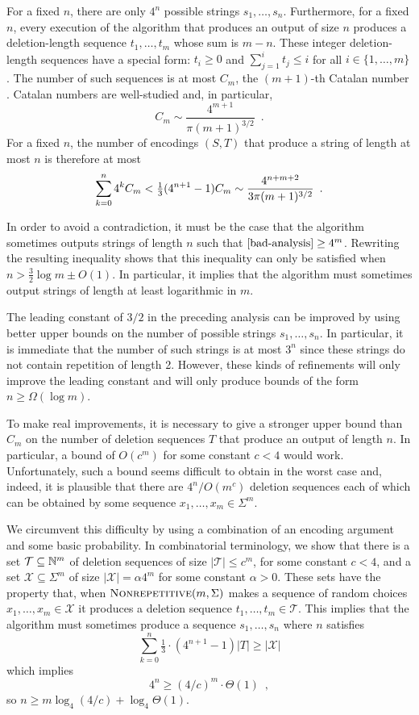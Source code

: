 \documentclass{patmorin}
\begin{document}
For a fixed $n$, there are only $4^n$ possible strings $s_1,\ldots,s_n$.  Furthermore, for a fixed $n$, every execution of the algorithm that produces an output of size $n$ produces a deletion-length sequence $t_1,\ldots,t_m$ whose sum is $m-n$.  These integer deletion-length sequences have a special form: $t_i\ge 0$ and $\sum_{j=1}^i t_j\le i$ for all $i\in\{1,\ldots,m\}$. The number of such sequences is at most $C_{m}$, the $(m+1)$-th Catalan number \cite{X}.  Catalan numbers are well-studied and, in particular,
\[
     C_m \sim \frac{4^{m+1}}{\pi(m+1)^{3/2}} \enspace .
\]
For a fixed $n$, the number of encodings $(S,T)$ that produce a string of length at most $n$ is therefore at most
\begin{equation}
     \sum_{k=0}^n 4^{k} C_m < \tfrac{1}{3}(4^{n+1}-1) C_m \sim \frac{4^{n+m+2}}{3\pi(m+1)^{3/2}} \enspace . \eqlabel{bad-analysis}
\end{equation}

In order to avoid a contradiction, it must be the case that the algorithm sometimes outputs strings of length $n$ such that $\eqref{bad-analysis} \ge 4^m$.  Rewriting the resulting inequality shows that this inequality can only be satisfied when $n > \tfrac{3}{2}\log m \pm O(1)$.  In particular, it implies that the algorithm must sometimes output strings of length at least logarithmic in $m$.

The leading constant of $3/2$ in the preceding analysis can be improved by using better upper bounds on the number of possible strings $s_1,\ldots,s_n$. In particular, it is immediate that the number of such strings is at most $3^{n}$ since these strings do not contain repetition of length 2.  However, these kinds of refinements will only improve the leading constant and will only produce bounds of the form $n\ge\Omega(\log m)$.  

To make real improvements, it is necessary to give a stronger upper bound than $C_m$ on the number of deletion sequences $T$ that produce an output of length $n$.  In particular, a bound of $O(c^m)$ for some constant $c<4$ would work.  Unfortunately, such a bound seems difficult to obtain in the worst case and, indeed, it is plausible that there are $4^n / O(m^c)$ deletion sequences each of which can be obtained by some sequence $x_1,\ldots,x_m\in \Sigma^m$.

We circumvent this difficulty by using a combination of an encoding argument and some basic probability.  In combinatorial terminology, we show that there is a set $\mathcal{T}\subseteq \mathbb{N}^m$ of deletion sequences of size $|\mathcal{T}|\le c^m$, for some constant $c<4$, and a set $\mathcal{X}\subseteq \Sigma^m$ of size $|\mathcal{X}|=\alpha 4^m$ for some constant $\alpha >0$.  These sets have the property that, when $\textsc{Nonrepetitive}(m,\Sigma)$ makes a sequence of random choices $x_1,\ldots,x_m\in \mathcal{X}$ it produces a deletion sequence $t_1,\ldots,t_m\in \mathcal{T}$. This implies that the algorithm must sometimes produce a sequence $s_1,\ldots,s_n$ where $n$ satisfies
\[
   \sum_{k=0}^n \tfrac{1}{3}\cdot(4^{n+1}-1) |T| \ge |\mathcal{X}|
\]
which implies
\[
  4^n \ge (4/c)^m \cdot \Theta(1) \enspace ,
\]
so $n \ge m\log_4(4/c) + \log_4\Theta(1)$.
\end{document}
